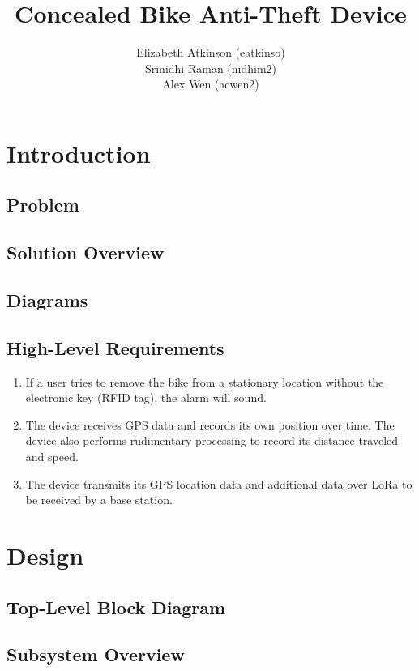 \documentclass[]{article}
\title{Concealed Bike Anti-Theft Device}
\author{Elizabeth Atkinson (eatkinso)\\ Srinidhi Raman (nidhim2) \\ Alex Wen (acwen2) }
\begin{document}
\maketitle

\section{Introduction}
\subsection{Problem}

\subsection{Solution Overview}

\subsection{Diagrams}

\subsection{High-Level Requirements}

\begin{enumerate}
	\item If a user tries to remove the bike from a stationary location without the electronic key (RFID tag), the alarm will sound. 
	
	\item The device receives GPS data and records its own position over time. The device also performs rudimentary processing to record its distance traveled and speed. 
	
	\item The device transmits its GPS location data and additional data over LoRa to be received by a base station. 
	
\end{enumerate}

\section{Design}
\subsection{Top-Level Block Diagram}

\subsection{Subsystem Overview}
\end{document}
